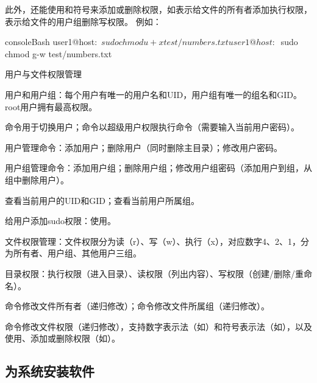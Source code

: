 此外，还能使用\code{+}和\code{-}符号来添加或删除权限，如表示给文件的所有者添加执行权限，表示给文件的用户组删除写权限。
例如：
\begin{envcode}{console}{Bash}
user1@host:~$ sudo chmod u+x test/numbers.txt
user1@host:~$ sudo chmod g-w test/numbers.txt
\end{envcode}

\begin{zj}
用户与文件权限管理

用户和用户组：每个用户有唯一的用户名和UID，用户组有唯一的组名和GID。root用户拥有最高权限。

命令用于切换用户；命令以超级用户权限执行命令（需要输入当前用户密码）。

用户管理命令：添加用户；删除用户（同时删除主目录）；修改用户密码。

用户组管理命令：添加用户组；删除用户组；修改用户组密码（添加用户到组，从组中删除用户）。

查看当前用户的UID和GID；查看当前用户所属组。

给用户添加sudo权限：使用。

文件权限管理：文件权限分为读（r）、写（w）、执行（x），对应数字4、2、1，分为所有者、用户组、其他用户三组。

目录权限：执行权限（进入目录）、读权限（列出内容）、写权限（创建/删除/重命名）。

命令修改文件所有者（递归修改）；命令修改文件所属组（递归修改）。

命令修改文件权限（递归修改），支持数字表示法（如）和符号表示法（如），以及使用\code{+}、\code{-}添加或删除权限（如）。
\end{zj}



\subsection{为系统安装软件}
